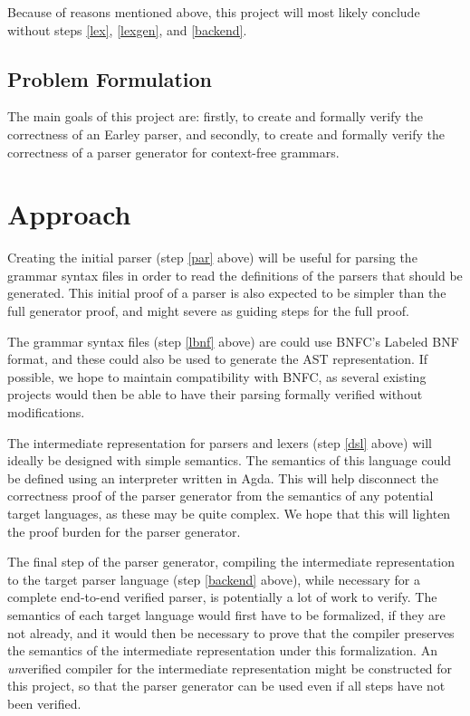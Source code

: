\documentclass{article}
\begin{document}
		Because of reasons mentioned above, this project will most likely
		conclude without steps \ref{lex}, \ref{lexgen}, and \ref{backend}.

	\subsection{Problem Formulation}

		The main goals of this project are: firstly, to create and formally
		verify the correctness of an Earley parser, and secondly, to create and
		formally verify the correctness of a parser generator for context-free 
		grammars.
	

\section{Approach}

	Creating the initial parser (step \ref{par} above) will be useful for
	parsing the grammar syntax files in order to read the definitions of the
	parsers that should be generated. This initial proof of a parser is also
	expected to be simpler than the full generator proof, and might severe as
	guiding steps for the full proof.

	The grammar syntax files (step \ref{lbnf} above) are could use BNFC's
	Labeled BNF format, and these could also be used to generate the AST
	representation. If possible, we hope to maintain compatibility with BNFC,
	as several existing projects would then be able to have their parsing
	formally verified without modifications.

	The intermediate representation for parsers and lexers (step \ref{dsl}
	above) will ideally be designed with simple semantics. The semantics of
	this language could be defined using an interpreter written in Agda. This
	will help disconnect the correctness proof of the parser generator from the
	semantics of any potential target languages, as these may be quite complex.
	We hope that this will lighten the proof burden for the parser generator.


	The final step of the parser generator, compiling the intermediate
	representation to the target parser language (step \ref{backend} above),
	while necessary for a complete end-to-end verified parser, is potentially a
	lot of work to verify. The semantics of each target language would first
	have to be formalized, if they are not already, and it would then be
	necessary to prove that the compiler preserves the semantics of the
	intermediate representation under this formalization. An \emph{un}verified
	compiler for the intermediate representation might be constructed for this
	project, so that the parser generator can be used even if all steps have
	not been verified.
\end{document}

